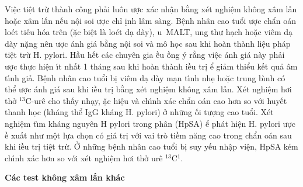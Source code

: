 \documentclass[9pt,twocolumn]{article}
\begin{document}
Vi{\^{\d{e}}}c ti{\^{\d{e}}}t trừ th\`{a}nh c{\^o}ng phải lu{\^o}n \text{\dj}ược x\'{a}c nh{\^{\d{a}}}n bằng x{\'e}t nghi{\^{\d{e}}}m kh{\^o}ng x\^{a}m lấn hoặc x\^{a}m lấn n{{\'{\^{e}}}}u n{\^{\d{o}}}i soi \text{\dj}ược chỉ \text{\dj}\d{i}nh l\^{a}m s\`{a}ng. B{\^{\d{e}}}nh nh\^{a}n cao tuổi \text{\dj}ược chẩn \text{\dj}o\'{a}n lo{\'e}t ti{\^{e}}u h{\'{o}}a tr{\^{e}}n (\text{\dj}ặc bi{\^{\d{e}}}t l\`{a} lo{\'e}t d{\d{a}} d\`{a}y), u~MALT, ung thư h{\d{a}}ch hoặc vi{\^{e}}m d{\d{a}} d\`{a}y nặng n{\^{e}}n \text{\dj}ược \text{\dj}\'{a}nh gi\'{a} bằng n{\^{\d{o}}}i soi v\`{a} m{\^o} h\d{o}c sau khi ho\`{a}n th\`{a}nh li{\^{\d{e}}}u ph\'{a}p ti{\^{\d{e}}}t trừ H. pylori. Hầu h{{\'{\^{e}}}}t c\'{a}c chuy{\^{e}}n gia \text{\dj}ều \text{\dj}ồng \'{y} rằng vi{\^{\d{e}}}c \text{\dj}\'{a}nh gi\'{a} n\`{a}y phải \text{\dj}ược thực hi{\^{\d{e}}}n \'{\i}t nhất 1 th\'{a}ng sau khi ho\`{a}n th\`{a}nh \text{\dj}iều tr\d{i} \text{\dj}ể giảm thiểu k{{\'{\^{e}}}}t quả \^{a}m t\'{\i}nh giả. B{\^{\d{e}}}nh nh\^{a}n cao tuổi b\d{i} vi{\^{e}}m d{\d{a}} d\`{a}y m{\d{a}}n t\'{\i}nh nh\d{e} hoặc trung b\`{\i}nh c{\'{o}} thể \text{\dj}ược \text{\dj}\'{a}nh gi\'{a} sau khi \text{\dj}iều tr\d{i} bằng x{\'e}t nghi{\^{\d{e}}}m kh{\^o}ng x\^{a}m lấn. X{\'e}t nghi{\^{\d{e}}}m hơi thở \ensuremath{^{13}}C-ur{\^{e}} cho thấy  nh{\d{a}}y,  \text{\dj}ặc hi{\^{\d{e}}}u v\`{a}  ch\'{\i}nh x\'{a}c chẩn \text{\dj}o\'{a}n cao hơn so với huy{{\'{\^{e}}}}t thanh h\d{o}c (kh\'{a}ng thể IgG kh\'{a}ng H. pylori) ở những \text{\dj}ối tượng cao tuổi. X{\'e}t nghi{\^{\d{e}}}m t\`{\i}m kh\'{a}ng nguy{\^{e}}n H pylori trong ph\^{a}n (HpSA) \text{\dj}ể ph\'{a}t hi{\^{\d{e}}}n H. pylori  \text{\dj}ược \text{\dj}ề xuất như m{\^{\d{o}}}t lựa ch\d{o}n c{\'{o}} gi\'{a} tr\d{i} với vai tr\`{o} tiềm n{\u{a}}ng cao trong chẩn \text{\dj}o\'{a}n sau khi \text{\dj}iều tr\d{i} ti{\^{\d{e}}}t trừ. Ở những b{\^{\d{e}}}nh nh\^{a}n cao tuổi b\d{i} suy y{{\'{\^{e}}}}u nh{\^{\d{a}}}p vi{\^{\d{e}}}n, HpSA k{\'e}m ch\'{\i}nh x\'{a}c hơn so với x{\'e}t nghi{\^{\d{e}}}m hơi thở ur{\^{e}} \ensuremath{^{13}}C\textbf{\ensuremath{^{1}}}.

\textbf{C\'{a}c test kh{\^o}ng x\^{a}m lấn kh\'{a}c}
\end{document}
